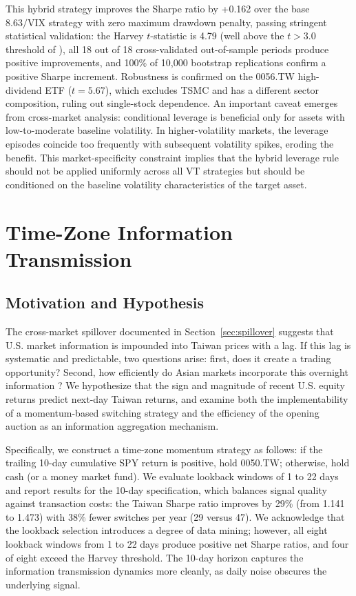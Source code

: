 This hybrid strategy improves the Sharpe ratio by +0.162 over the base $8.63/\text{VIX}$ strategy with zero maximum drawdown penalty, passing stringent statistical validation: the Harvey $t$-statistic is 4.79 (well above the $t > 3.0$ threshold of \citealt{harvey2016}), all 18 out of 18 cross-validated out-of-sample periods produce positive improvements, and 100\% of 10,000 bootstrap replications confirm a positive Sharpe increment. Robustness is confirmed on the 0056.TW high-dividend ETF ($t = 5.67$), which excludes TSMC and has a different sector composition, ruling out single-stock dependence. An important caveat emerges from cross-market analysis: conditional leverage is beneficial only for assets with low-to-moderate baseline volatility. In higher-volatility markets, the leverage episodes coincide too frequently with subsequent volatility spikes, eroding the benefit. This market-specificity constraint implies that the hybrid leverage rule should not be applied uniformly across all VT strategies but should be conditioned on the baseline volatility characteristics of the target asset.



\section{Time-Zone Information Transmission}
\label{sec:tz}

\subsection{Motivation and Hypothesis}

The cross-market spillover documented in Section~\ref{sec:spillover} suggests that U.S. market information is impounded into Taiwan prices with a lag. If this lag is systematic and predictable, two questions arise: first, does it create a trading opportunity? Second, how efficiently do Asian markets incorporate this overnight information \citep{barclay2003}? We hypothesize that the sign and magnitude of recent U.S. equity returns predict next-day Taiwan returns, and examine both the implementability of a momentum-based switching strategy and the efficiency of the opening auction as an information aggregation mechanism.

Specifically, we construct a time-zone momentum strategy as follows: if the trailing 10-day cumulative SPY return is positive, hold 0050.TW; otherwise, hold cash (or a money market fund). We evaluate lookback windows of 1 to 22 days and report results for the 10-day specification, which balances signal quality against transaction costs: the Taiwan Sharpe ratio improves by 29\% (from 1.141 to 1.473) with 38\% fewer switches per year (29 versus 47). We acknowledge that the lookback selection introduces a degree of data mining; however, all eight lookback windows from 1 to 22 days produce positive net Sharpe ratios, and four of eight exceed the Harvey threshold. The 10-day horizon captures the information transmission dynamics more cleanly, as daily noise obscures the underlying signal.

